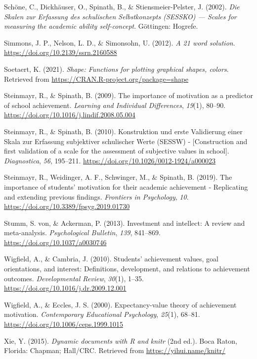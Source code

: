 \documentclass[
  man]{apa6}
\newlength{\cslhangindent}
\newlength{\cslentryspacingunit} %
\newenvironment{CSLReferences}[2] %
 {%
  \setlength{\parindent}{0pt}
  \ifodd #1
  \let\oldpar\par
  \def\par{\hangindent=\cslhangindent\oldpar}
  \fi
  \setlength{\parskip}{#2\cslentryspacingunit}
 }%
 {}
\begin{document}
\begin{CSLReferences}{1}{0}
\leavevmode{}%
Schöne, C., Dickhäuser, O., Spinath, B., \& Stiensmeier-Pelster, J. (2002). \emph{{Die Skalen zur Erfassung des schulischen Selbstkonzepts (SESSKO) --- Scales for measuring the academic ability self-concept}}. G{ö}ttingen: Hogrefe.

\leavevmode{}%
Simmons, J. P., Nelson, L. D., \& Simonsohn, U. (2012). \emph{A 21 word solution}. \url{https://doi.org/10.2139/ssrn.2160588}

\leavevmode{}%
Soetaert, K. (2021). \emph{Shape: Functions for plotting graphical shapes, colors}. Retrieved from \url{https://CRAN.R-project.org/package=shape}

\leavevmode{}%
Steinmayr, R., \& Spinath, B. (2009). The importance of motivation as a predictor of school achievement. \emph{Learning and Individual Differences}, \emph{19}(1), 80--90. \url{https://doi.org/10.1016/j.lindif.2008.05.004}

\leavevmode{}%
Steinmayr, R., \& Spinath, B. (2010). {Konstruktion und erste Validierung einer Skala zur Erfassung subjektiver schulischer Werte (SESSW) - {[}Construction and first validation of a scale for the assessment of subjective values in school{]}}. \emph{Diagnostica}, \emph{56}, 195--211. \url{https://doi.org/10.1026/0012-1924/a000023}

\leavevmode{}%
Steinmayr, R., Weidinger, A. F., Schwinger, M., \& Spinath, B. (2019). The importance of students' motivation for their academic achievement - {R}eplicating and extending previous findings. \emph{Frontiers in Psychology}, \emph{10}. \url{https://doi.org/10.3389/fpsyg.2019.01730}

\leavevmode{}%
Stumm, S. von, \& Ackerman, P. (2013). Investment and intellect: A review and meta-analysis. \emph{Psychological Bulletin}, \emph{139}, 841--869. \url{https://doi.org/10.1037/a0030746}

\leavevmode{}%
Wigfield, A., \& Cambria, J. (2010). Students' achievement values, goal orientations, and interest: Definitions, development, and relations to achievement outcomes. \emph{Developmental Review}, \emph{30}(1), 1--35. \url{https://doi.org/10.1016/j.dr.2009.12.001}

\leavevmode{}%
Wigfield, A., \& Eccles, J. S. (2000). Expectancy-value theory of achievement motivation. \emph{Contemporary Educational Psychology}, \emph{25}(1), 68--81. \url{https://doi.org/10.1006/ceps.1999.1015}

\leavevmode{}%
Xie, Y. (2015). \emph{Dynamic documents with {R} and knitr} (2nd ed.). Boca Raton, Florida: Chapman; Hall/CRC. Retrieved from \url{https://yihui.name/knitr/}

\end{CSLReferences}

\endgroup

\newpage
\end{document}
